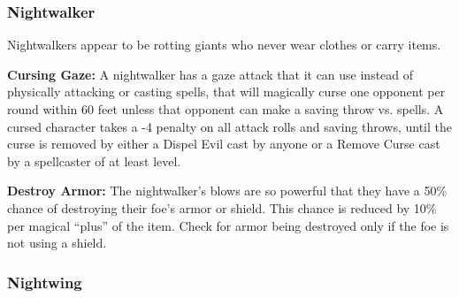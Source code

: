 \begin{multicols*}{2}
\subsubsection{Nightwalker}

Nightwalkers appear to be rotting giants who never wear clothes or carry items.

\textbf{Cursing Gaze:} A nightwalker has a gaze attack that it can use instead of physically attacking or casting spells, that will magically curse one opponent per round within 60 feet unless that opponent can make a saving throw vs. spells. A cursed character takes a -4 penalty on all attack rolls and saving throws, until the curse is removed by either a Dispel Evil cast by anyone or a Remove Curse cast by a spellcaster of at least  level.

\textbf{Destroy Armor:} The nightwalker's blows are so powerful that they have a 50\% chance of destroying their foe’s armor or shield. This chance is reduced by 10\% per magical “plus” of the item. Check for armor being destroyed only if the foe is not using a shield.

\subsubsection{Nightwing}
\end{multicols*}
